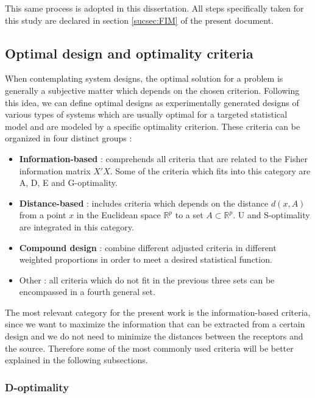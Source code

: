 This same process is adopted in this dissertation. All steps specifically taken for this study are declared in section \ref{sucsec:FIM} of the present document.


\subsection{Optimal design and optimality criteria}	\label{sec:optimaldesign}

When contemplating system designs, the optimal solution for a problem is generally a subjective matter which depends on the chosen criterion. Following this idea, we can define optimal designs as experimentally generated designs of various types of systems which are usually optimal for a targeted statistical model and are modeled by a specific optimality criterion. These criteria can be organized in four distinct groups \cite{compare-optimality-crit}:
\begin{itemize}
	\item \textbf{Information-based} : comprehends all criteria that are related to the Fisher information matrix $X'X$. Some of the criteria which fits into this category are A, D, E and G-optimality.
	\item \textbf{Distance-based} : includes criteria which depends on the distance $d(x,A)$ from a point $x$ in the Euclidean space $\mathbb{R}^{p}$ to a set $A \subset \mathbb{R}^{p}$. U and S-optimality are integrated in this category.
	\item \textbf{Compound design} : combine different adjusted criteria in different weighted proportions in order to meet a desired statistical function.
	\item Other : all criteria which do not fit in the previous three sets can be encompassed in a fourth general set.
\end{itemize}

The most relevant category for the present work is the information-based criteria, since we want to maximize the information that can be extracted from a certain design and we do not need to minimize the distances between the receptors and the source. Therefore some of the most commonly used criteria will be better explained in the following subsections.

\subsubsection{D-optimality}

